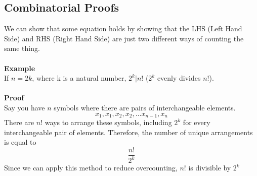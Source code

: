 \documentclass[12pt]{article}
\begin{document}
	\subsection{Combinatorial Proofs}
	We can show that some equation holds by showing that the LHS (Left Hand Side) and RHS (Right Hand Side) are just two different ways of counting the same thing.\\\\
	\textbf{Example}\\
	If $n = 2k$, where k is a natural number, $2^k \vert n!$ ($2^k$ evenly divides $n!$).\\\\
	\textbf{Proof}\\
	Say you have $n$ symbols where there are pairs of interchangeable elements.
	$$x_1, x_1, x_2, x_2, \ldots x_{n-1}, x_n$$
	There are $n!$ ways to arrange these symbols, including $2^k$ for every interchangeable pair of elements. Therefore, the number of unique arrangements is equal to 
	$$\frac{n!}{2^k}$$
	Since we can apply this method to reduce overcounting, $n!$ is divisible by $2^k$
\end{document}
